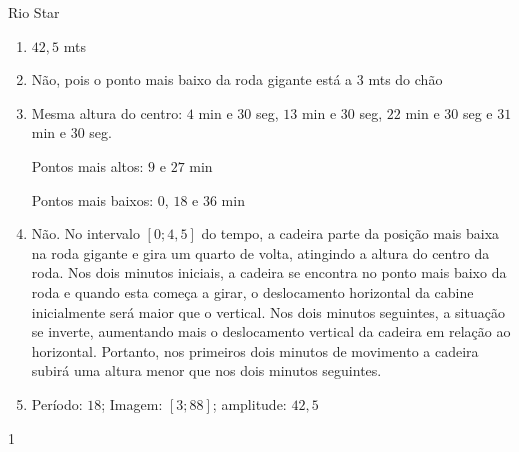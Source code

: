 \begin{answer}{Rio Star}
{
	\begin{enumerate}
	\item $42{,}5$ mts
	\item Não, pois o ponto mais baixo da roda gigante está a $3$ mts
	do chão
	\item Mesma altura do centro: $4$ min e $30$ seg, $13$ min e $30$ seg,
	$22$ min e $30$ seg e $31$ min e $30$ seg.

	Pontos mais altos: $9$ e $27$ min

	Pontos mais baixos: $0$, $18$ e $36$ min
	\item Não. No intervalo $[0; 4{,}5]$ do tempo, a cadeira parte da
	posição mais baixa na roda gigante e gira um quarto de volta,
	atingindo a altura do centro da roda. Nos dois minutos
	iniciais, a cadeira se encontra no ponto mais baixo da roda e
	quando esta começa a girar, o deslocamento horizontal da
	cabine inicialmente será maior que o vertical. Nos dois
	minutos seguintes, a situação se inverte, aumentando mais o
	deslocamento vertical da cadeira em relação ao horizontal.
	Portanto, nos primeiros dois minutos de movimento a cadeira
	subirá uma altura menor que nos dois minutos seguintes.
	\item Período: $18$; Imagem: $[3;88]$; amplitude: $42{,}5$
	\end{enumerate}
}{1}
\end{answer}
\clearmargin
